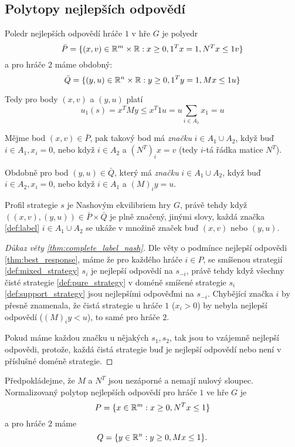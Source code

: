 \subsection{Polytopy nejlepších odpovědí}
\begin{definition} 
\label{def:best_response_polyhedrom}
Poledr nejlepších odpovědí hráče $1$ v hře $G$ je polyedr 
$$
\bar{P} = \{(x,v)\in \mathbb{R}^m \times \mathbb{R}: x \geq 0, 1^Tx = 1, N^Tx \leq 1v\}
$$ 
a pro hráče $2$ máme obdobný:
$$
\bar{Q} = \{(y,u)\in \mathbb{R}^n \times \mathbb{R}: y \geq 0, 1^Ty = 1, Mx \leq 1u\}
$$
\end{definition}
Tedy pro body $(x,v)$ a $(y,u)$ platí 
$$ 
u_1(s) = x^T M y \leq x^T1u = u \sum_{i \in A_1} x_1 = u 
$$ 
\begin{definition}[Značka]
\label{def:label}
Mějme bod $(x,v) \in \bar{P}$, pak takový bod má \textit{značku} $i \in A_1 \cup A_2$, když buď $i \in A_1, x_i = 0$, nebo když $i \in A_2$ a $(N^T)_i x = v$ (tedy $i$-tá řádka matice $N^T$). 

Obdobně pro bod $(y,u) \in \bar{Q}$, který má \textit{značku} $i \in A_1 \cup A_2$, když buď $i \in A_2, x_i = 0$, nebo když $i \in A_1$ a $(M)_i y = u$. 
\end{definition}
\begin{theorem}
\label{thm:complete_label_nash}
Profil strategie $s$ je Nashovým ekvilibriem hry $G$, právě tehdy když $((x,v), (y,u))\in \bar{P} \times \bar{Q}$ je plně značený, jinými slovy, každá značka \ref{def:label} $i \in A_1 \cup A_2$ se ukáže v množině značek buď $(x,v)$ nebo $(y,u)$.
\end{theorem}
\begin{proof}[Důkaz věty \ref{thm:complete_label_nash}]
    Dle věty o podmínce nejlepší odpovědi \ref{thm:best_response}, máme že pro každého hráče $i \in P$, se smíšenou strategií \ref{def:mixed_strategy} $s_i$ je nejlepší odpovědí na $s_{-i}$, právě tehdy když všechny čisté strategie \ref{def:pure_strategy} v doméně smíšené strategie $s_i$ \ref{def:support_strategy} jsou nejlepšími odpověďmi na $s_{-i}$. 
    Chybějící značka $i$ by přesně znamenala, že čistá strategie u hráče $1$ ($x_i >0$) by nebyla nejlepší odpovědí ($(M)_i y < u$), to samé pro hráče $2$. 

    Pokud máme každou značku u nějakých $s_1, s_2$, tak jsou to vzájemně nejlepší odpovědi, protože, každá čistá strategie buď je nejlepší odpovědí nebo není v příslušné doméně strategie.
\end{proof}

\begin{definition}
\label{def:norm_best_response_poly}
Předpokládejme, že $M$ a $N^T$ jsou nezáporné a nemají nulový sloupec. 
Normalizovaný polytop nejlepších odpovědí pro hráče $1$ ve hře $G$ je 
$$
P = \{x\in \mathbb{R}^m: x \geq 0, N^Tx \leq 1\}
$$ 
a pro hráče $2$ máme
$$
Q = \{y\in \mathbb{R}^n: y \geq 0, Mx \leq 1\}.
$$
\end{definition}

